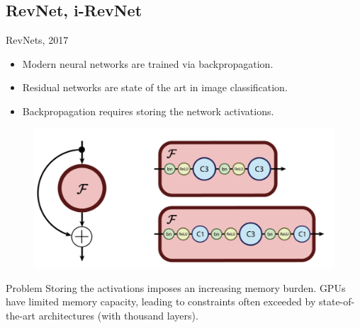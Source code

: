 \documentclass{beamer}
\begin{document}
\subsection{RevNet, i-RevNet}
\begin{frame}{RevNets, 2017}
	\begin{minipage}[t]{0.6\columnwidth}
		\begin{itemize}
			\item Modern neural networks are trained via backpropagation.
			\item Residual networks are state of the art in image classification.
			\item Backpropagation requires storing the network activations.
		\end{itemize}
	\end{minipage}%
	\begin{minipage}[t]{0.4\columnwidth}
		\begin{figure}
			\centering
			\includegraphics[width=\linewidth]{figs/resnet_block.png}
		\end{figure}
	\end{minipage}
	\vspace{0.1cm}
	\begin{block}{Problem}
		Storing the activations imposes an increasing memory burden. GPUs have limited memory capacity, leading to constraints often exceeded by state-of-the-art architectures (with thousand layers).
	\end{block}
\end{frame}
\end{document}
